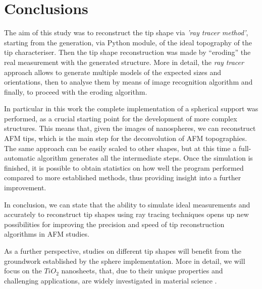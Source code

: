\chapter{Conclusions}

The aim of this study was to reconstruct the tip shape via \textit{'ray tracer method'}, starting from the generation, via Python module, of the ideal topography of the tip characteriser. Then the tip shape reconstruction was made by “eroding” the real measurement with the generated structure.
More in detail, the \textit{ray tracer} approach allows to generate multiple models of the expected sizes and orientations, then to analyse them by means of image recognition algorithm and finally, to proceed with the eroding algorithm.

In particular in this work the complete implementation of a spherical support was performed, as a crucial starting point for the development of more complex structures. This means that, given the images of nanospheres, we can reconstruct AFM tips, which is the main step for the deconvolution of AFM topographies. The same approach can be easily scaled to other shapes, but at this time a full-automatic algorithm generates all the intermediate steps. Once the simulation is finished, it is possible to obtain statistics on how well the program performed compared to more established methods, thus providing insight into a further improvement.

In conclusion, we can state that the ability to simulate ideal measurements and accurately to reconstruct tip shapes using ray tracing techniques opens up new possibilities for improving the precision and speed of tip reconstruction algorithms in AFM studies. 

\vspace{10pt}

As a further perspective, studies on different tip shapes will benefit from the groundwork established by the sphere implementation. More in detail, we will focus on the $TiO_2$ nanosheets, that, due to their unique properties and challenging applications, are widely investigated in material science \cite{scarano}.
